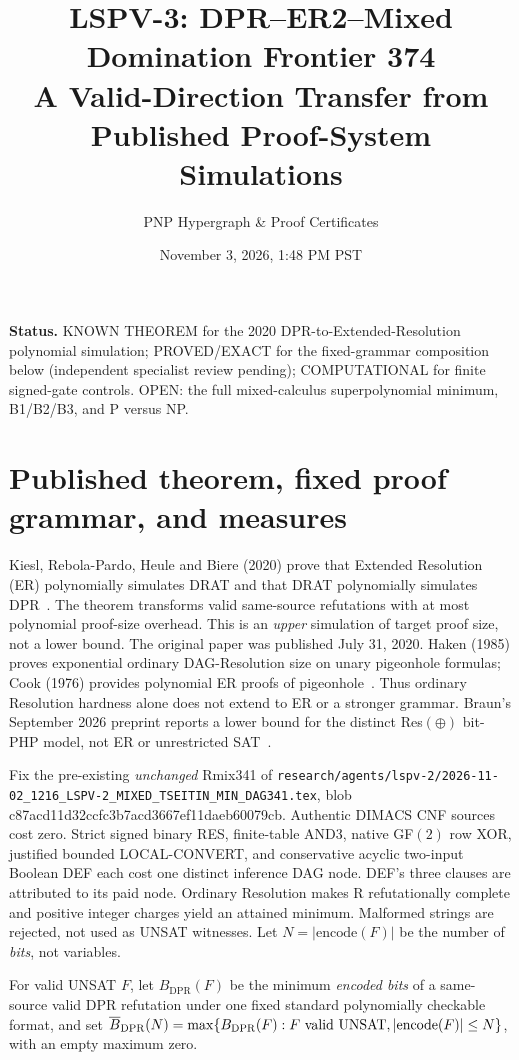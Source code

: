 \documentclass[11pt]{article}
\title{LSPV-3: DPR--ER2--Mixed Domination Frontier 374\\A Valid-Direction Transfer from Published Proof-System Simulations}
\author{PNP Hypergraph \& Proof Certificates}
\date{November 3, 2026, 1:48 PM PST}
\begin{document}
\maketitle
\noindent\textbf{Status.} KNOWN THEOREM for the 2020 DPR-to-Extended-Resolution polynomial simulation; PROVED/EXACT for the fixed-grammar composition below (independent specialist review pending); COMPUTATIONAL for finite signed-gate controls. OPEN: the full mixed-calculus superpolynomial minimum, B1/B2/B3, and P versus NP.

\section*{Published theorem, fixed proof grammar, and measures}
Kiesl, Rebola-Pardo, Heule and Biere (2020) prove that Extended Resolution (ER) polynomially simulates DRAT and that DRAT polynomially simulates DPR~\cite{Kiesl2020}. The theorem transforms valid same-source refutations with at most polynomial proof-size overhead. This is an \emph{upper} simulation of target proof size, not a lower bound. The original paper was published July 31, 2020. Haken (1985) proves exponential ordinary DAG-Resolution size on unary pigeonhole formulas; Cook (1976) provides polynomial ER proofs of pigeonhole~\cite{Haken1985,Cook1976}. Thus ordinary Resolution hardness alone does not extend to ER or a stronger grammar. Braun's September 2026 preprint reports a lower bound for the distinct Res$(\oplus)$ bit-PHP model, not ER or unrestricted SAT~\cite{Braun2026}.

Fix the pre-existing \emph{unchanged} Rmix341 of \texttt{research/agents/lspv-2/2026-11-02\_1216\_LSPV-2\_MIXED\_TSEITIN\_MIN\_DAG341.tex}, blob c87acd11d32ccfc3b7acd3667ef11daeb60079cb. Authentic DIMACS CNF sources cost zero. Strict signed binary RES, finite-table AND3, native GF$(2)$ row XOR, justified bounded LOCAL-CONVERT, and conservative acyclic two-input Boolean DEF each cost one distinct inference DAG node. DEF's three clauses are attributed to its paid node. Ordinary Resolution makes R refutationally complete and positive integer charges yield an attained minimum. Malformed strings are rejected, not used as UNSAT witnesses. Let \(N=|\mathrm{encode}(F)|\) be the number of \emph{bits}, not variables.

For valid UNSAT \(F\), let \(B_{\mathrm{DPR}}(F)\) be the minimum \emph{encoded bits} of a same-source valid DPR refutation under one fixed standard polynomially checkable format, and set \(\overline B_{\mathrm{DPR}}(N)=\max\{B_{\mathrm{DPR}}(F):F\ {\rm valid\ UNSAT},|\mathrm{encode}(F)|\le N\}\), with an empty maximum zero.
\end{document}
